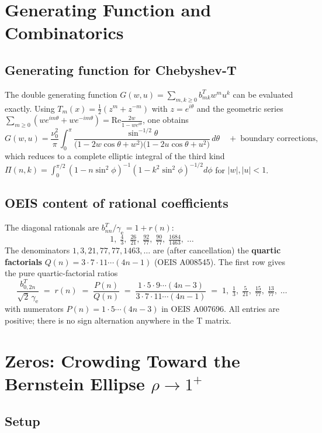 \documentclass[11pt,a4paper]{article}
\begin{document}
\section{Generating Function and Combinatorics}

\subsection{Generating function for Chebyshev-T}

The double generating function $G(w,u)=\sum_{m,k\ge0}b_{mk}^T w^m u^k$ can be evaluated
exactly.  Using $T_m(x)=\tfrac12(z^m+z^{-m})$ with $z=e^{i\theta}$ and the geometric series
$\sum_{m\ge0}(we^{im\theta}+we^{-im\theta})=\mathrm{Re}\tfrac{2w}{1-we^{i\theta}}$, one obtains
\[
  G(w,u) = \frac{\nu_0^2}{\pi}
  \int_0^\pi \frac{\sin^{-1/2}\theta}
    {\bigl(1-2w\cos\theta+w^2\bigr)\bigl(1-2u\cos\theta+u^2\bigr)}\,d\theta
  \quad+\;\text{boundary corrections},
\]
which reduces to a complete elliptic integral of the third kind
$\Pi(n,k)=\int_0^{\pi/2}(1-n\sin^2\phi)^{-1}(1-k^2\sin^2\phi)^{-1/2}d\phi$
for $|w|,|u|<1$.

\subsection{OEIS content of rational coefficients}

The diagonal rationals are $b_{nn}^T/\gamma_\mathrm{e}=1+r(n)$:
\[
1,\;\tfrac{4}{3},\;\tfrac{26}{21},\;\tfrac{92}{77},\;\tfrac{90}{77},\;\tfrac{1684}{1463},\;\ldots
\]
The denominators $1,3,21,77,77,1463,\ldots$ are (after cancellation) the
\textbf{quartic factorials} $Q(n)=3\cdot7\cdot11\cdots(4n-1)$ (OEIS A008545).
The first row gives the pure quartic-factorial ratios
\[
  \frac{b_{0,2n}^T}{\sqrt2\,\gamma_\mathrm{e}} \;=\; r(n)
  \;=\;\frac{P(n)}{Q(n)}
  \;=\;\frac{1\cdot5\cdot9\cdots(4n-3)}{3\cdot7\cdot11\cdots(4n-1)}
  \;=\;1,\;\tfrac13,\;\tfrac{5}{21},\;\tfrac{15}{77},\;\tfrac{13}{77},\;\ldots
\]
with numerators $P(n)=1\cdot5\cdots(4n-3)$ in OEIS A007696.  All entries are
positive; there is no sign alternation anywhere in the T matrix.

\section{Zeros: Crowding Toward the Bernstein Ellipse $\rho\to1^+$}

\subsection{Setup}
\end{document}
